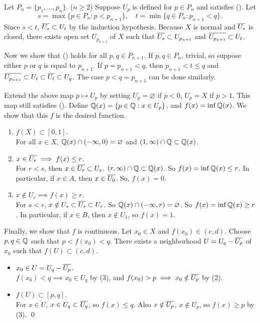 Let \(P_n = \{p_1, \dots, p_n\}\). (\(n\geq 2\)) Suppose \(U_p\) is defined for \(p \in P_n\) and satisfies (\mast). Let
\[
    s = \max\{p \in P_n : p < p_{n+1}\}, \quad t = \min\{q \in P_n : p_{n+1} < q\}.
\]
Since \(s < t\), \(\overline{U_s} \subset U_t\) by the induction hypothesis. Because \(X\) is normal and \(\overline{U_s}\) is closed, there exists open set \(U_{p_{n+1}}\) of \(X\) such that \(\overline{U_s} \subset U_{p_{n+1}}\) and \(\overline{U_{p_{n+1}}} \subset U_t\).

Now we show that (\mast) holds for all \(p, q \in P_{n+1}\). If \(p, q \in P_n\), trivial, so suppose either \(p\) or \(q\) is equal to \(p_{n+1}\). If \(p = p_{n+1} < q\), then \(p_{n+1} < t \leq q\) and \(\overline{U_{p_{n+1}}} \subset U_t \subset \overline{U_t} \subset U_q\). The case \(p < q = p_{n+1}\) can be done similarly.

 Extend the above map \(p \mapsto U_p\) by setting \(U_p = \varnothing\) if \(p < 0\), \(U_p = X\) if \(p > 1\). This map still satisfies (\mast). Define \(\mathbb{Q}(x) = \{p \in \mathbb{Q} : x \in U_p\}\), and \(f(x) = \inf \mathbb{Q}(x)\). We show that this \(f\) is the desired function.

\begin{enumerate}
    \item \(f(X) \subset [0, 1]\). \\
    For all \(x \in X\), \(\mathbb{Q}(x) \cap (-\infty, 0) = \varnothing\) and \((1, \infty) \cap \mathbb{Q} \subset \mathbb{Q}(x)\).

    \item \(x \in \overline{U_r} \implies f(x) \leq r\). \\
    For \(r < s\), then \(x \in \overline{U_r} \subset U_s\). \((r, \infty) \cap \mathbb{Q} \subset \mathbb{Q}(x)\). So \(f(x) = \inf \mathbb{Q}(x) \leq r\). In particular, if \(x \in A\), then \(x \in \overline{U_0}\). So, \(f(x) = 0\).

    \item \(x \notin U_r \implies f(x) \geq r\). \\
    For \(s < r\), \(x \notin U_s \subset \overline{U_s} \subset U_r\). So \(\mathbb{Q}(x) \cap (-\infty, r) = \varnothing\). So \(f(x) = \inf \mathbb{Q}(x) \geq r\). In particular, if \(x \in B\), then \(x \notin U_1\), so \(f(x) = 1\).
\end{enumerate}

Finally, we show that \(f\) is continuous. Let \(x_0 \in X\) and \(f(x_0) \in (c, d)\). Choose \(p, q \in \mathbb{Q}\) such that \(p < f(x_0) < q\). There exists a neighborhood \(U = U_q - \overline{U_p}\) of \(x_0\) such that \(f(U) \subset (c, d)\).
\begin{itemize}
    \item \(x_0 \in U = U_q - \overline{U_p}\). \\
    \(f(x_0) < q \implies x_0 \in U_q\) by (3), and \(f(x_0) > p \implies x_0\notin \overline{U_p}\) by (2).

    \item \(f(U) \subset [p, q]\). \\
    For \(x \in U\), \(x \in U_q \subset \overline{U_q}\), so \(f(x) \leq q\). Also \(x \notin \overline{U_p}\), \(x \notin U_p\), so \(f(x) \geq p\) by (3). \qed
\end{itemize}

